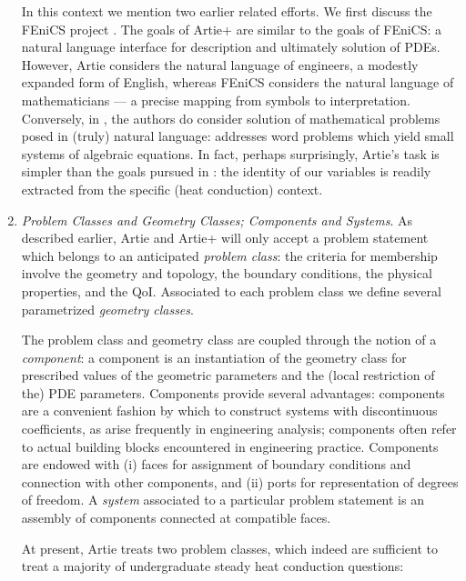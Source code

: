 \documentclass[preprint,12pt]{article}
\begin{document}
\begin{enumerate}
In this context we mention two earlier related efforts. We first discuss the FEniCS project \cite{FEniCS}. The goals of Artie+ are similar to the goals of FEniCS: a natural language interface for description and ultimately solution of PDEs. However, Artie considers the natural language of engineers, a modestly expanded form of English, whereas FEniCS considers the natural language of mathematicians --- a precise mapping from symbols to interpretation. Conversely, in \cite{alg_wordproblems}, the authors do consider solution of mathematical problems posed in (truly) natural language: \cite{alg_wordproblems} addresses word problems which yield small systems of algebraic equations. In fact, perhaps surprisingly, Artie's task is simpler than the goals pursued in \cite{alg_wordproblems}: the identity of our variables is readily extracted from the specific (heat conduction) context.


\item {\em Problem Classes and Geometry Classes; Components and Systems}. As described earlier, Artie and Artie+ will only accept a problem statement which belongs to an anticipated {\em problem class}: the criteria for membership involve the geometry and topology, the boundary conditions, the physical properties, and the QoI. Associated to each problem class we define several parametrized {\em geometry classes}. 

The problem class and geometry class are coupled through the notion of a {\em component}: a component is an instantiation of the geometry class for prescribed values of the geometric parameters and the (local restriction of the) PDE parameters. Components provide several advantages: components are a convenient fashion by which to construct systems with discontinuous coefficients, as arise frequently in engineering analysis; components often refer to actual building blocks encountered in engineering practice. Components are endowed with (i) faces for assignment of boundary conditions and connection with other components, and (ii) ports for representation of degrees of freedom. A {\em system} associated to a particular problem statement is an assembly of components connected at compatible faces. 

At present, Artie treats two problem classes, which indeed are sufficient to treat a majority of undergraduate steady heat conduction questions:


\end{enumerate}
\end{document}
